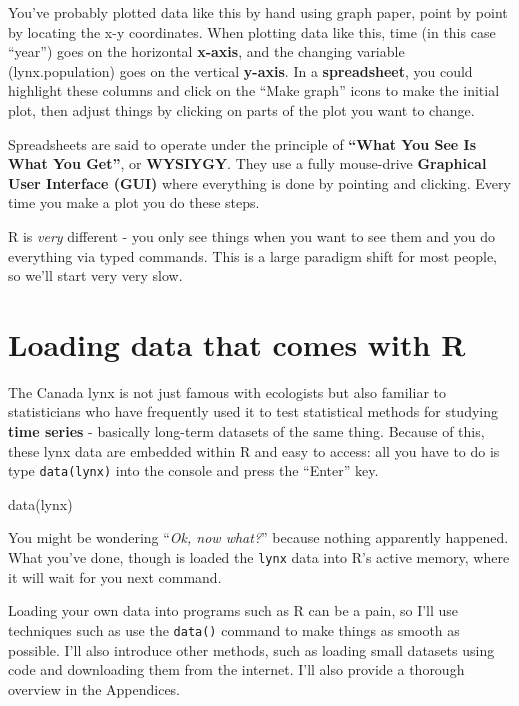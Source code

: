 \documentclass[
]{book}
\newenvironment{Shaded}{\begin{snugshade}}{\end{snugshade}}
\newcommand{\FunctionTok}[1]{\textcolor[rgb]{0.00,0.00,0.00}{#1}}
\newcommand{\NormalTok}[1]{#1}
\begin{document}
You've probably plotted data like this by hand using graph paper, point by point by locating the x-y coordinates. When plotting data like this, time (in this case ``year'') goes on the horizontal \textbf{x-axis}, and the changing variable (lynx.population) goes on the vertical \textbf{y-axis}. In a \textbf{spreadsheet}, you could highlight these columns and click on the ``Make graph'' icons to make the initial plot, then adjust things by clicking on parts of the plot you want to change.

Spreadsheets are said to operate under the principle of \textbf{``What You See Is What You Get''}, or \textbf{WYSIYGY}. They use a fully mouse-drive \textbf{Graphical User Interface (GUI)} where everything is done by pointing and clicking. Every time you make a plot you do these steps.

R is \emph{very} different - you only see things when you want to see them and you do everything via typed commands. This is a large paradigm shift for most people, so we'll start very very slow.

\hypertarget{loading-data-that-comes-with-r}{%
\section{Loading data that comes with R}\label{loading-data-that-comes-with-r}}

The Canada lynx is not just famous with ecologists but also familiar to statisticians who have frequently used it to test statistical methods for studying \textbf{time series} - basically long-term datasets of the same thing. Because of this, these lynx data are embedded within R and easy to access: all you have to do is type \texttt{data(lynx)} into the console and press the ``Enter'' key.

\begin{Shaded}
\begin{Highlighting}[]
\FunctionTok{data}\NormalTok{(lynx)}
\end{Highlighting}
\end{Shaded}

You might be wondering ``\emph{Ok, now what?}'' because nothing apparently happened. What you've done, though is loaded the \texttt{lynx} data into R's active memory, where it will wait for you next command.

Loading your own data into programs such as R can be a pain, so I'll use techniques such as use the \texttt{data()} command to make things as smooth as possible. I'll also introduce other methods, such as loading small datasets using code and downloading them from the internet. I'll also provide a thorough overview in the Appendices.
\end{document}
